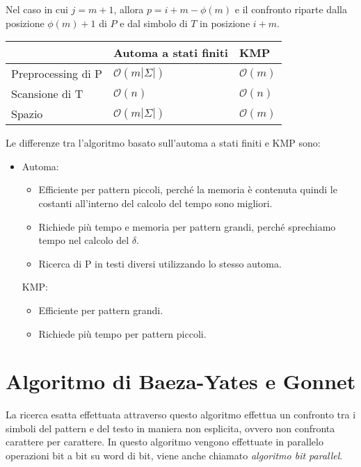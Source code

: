 Nel caso in cui $j = m + 1$, allora $p = i + m - \phi(m)$ e il confronto
riparte dalla posizione $\phi(m) + 1$ di $P$ e dal simbolo di $T$ in posizione
$i + m$.
\begin{table}[!ht]
    \centering
    \begin{tabular}{|l|l|l|}
        \hline
                           & Automa a stati finiti     & KMP              \\ \hline
        Preprocessing di P & $\mathcal{O}(m |\Sigma|)$ & $\mathcal{O}(m)$ \\ \hline
        Scansione di T     & $\mathcal{O}(n)$          & $\mathcal{O}(n)$ \\ \hline
        Spazio             & $\mathcal{O}(m |\Sigma|)$ & $\mathcal{O}(m)$ \\ \hline
    \end{tabular}
\end{table}
Le differenze tra l'algoritmo basato sull'automa a stati finiti e KMP sono:
\begin{itemize}
    \item Automa:
          \begin{itemize}
              \item Efficiente per pattern piccoli, perché la memoria è contenuta
                    quindi le costanti all'interno del calcolo del tempo sono
                    migliori.
              \item Richiede più tempo e memoria per pattern grandi, perché
                    sprechiamo tempo nel calcolo del $\delta$.
              \item Ricerca di P in testi diversi utilizzando lo stesso automa.
          \end{itemize}
          KMP:
          \begin{itemize}
              \item Efficiente per pattern grandi.
              \item Richiede più tempo per pattern piccoli.
          \end{itemize}
\end{itemize}
\section{Algoritmo di Baeza-Yates e Gonnet}
La ricerca esatta effettuata attraverso questo algoritmo effettua un confronto
tra i simboli del pattern e del testo in maniera non esplicita, ovvero non
confronta carattere per carattere. In questo algoritmo vengono effettuate in
parallelo operazioni bit a bit su word di bit, viene anche chiamato
\textit{algoritmo bit parallel}.

